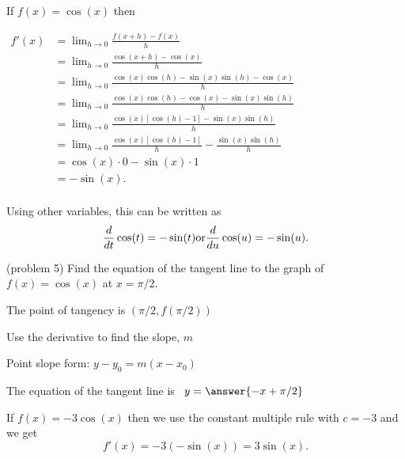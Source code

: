\documentclass{ximera}
\begin{document}
\begin{explanation}
If $f(x) = \cos(x)$ then\\
\begin{center}
$\begin{aligned}
f'(x) &= \lim_{h \to 0} \frac{f(x+h)-f(x)}{h} \\[5pt]
&= \lim_{h \to 0} \frac{\cos(x+h) - \cos(x)}{h}\\[5pt]
&=  \lim_{h \to 0} \frac{\cos(x)\cos(h) - \sin(x)\sin(h) - \cos(x)}{h}\\[5pt]
&=  \lim_{h \to 0} \frac{\cos(x)\cos(h) - \cos(x) - \sin(x)\sin(h)}{h}\\[5pt]
&=  \lim_{h \to 0} \frac{\cos(x)[\cos(h) -1] - \sin(x)\sin(h)}{h}\\[5pt]
&=  \lim_{h \to 0} \frac{\cos(x)[\cos(h) -1]}{h} - \frac{\sin(x)\sin(h)}{h}\\[5pt]
&=   \cos(x) \cdot 0 - \sin(x)\cdot 1\\[5pt]
&= -\sin(x).\\[5pt]
\end{aligned}$
\end{center}
Using other variables, this can be written as
\[
\frac{d}{dt} \cos(t) = -\sin(t) \\
\text{or}\\
\frac{d}{du} \cos(u) = -\sin(u).
\]

\end{explanation}


\begin{problem}(problem 5)
Find the equation of the tangent line to the graph of $f(x) = \cos(x)$ at $x=\pi/2.$


\begin{hint}
The point of tangency is $(\pi/2, f(\pi/2))$
\end{hint}
\begin{hint}
Use the derivative to find the slope, $m$
\end{hint}
\begin{hint}
Point slope form: $y-y_0 = m(x-x_0)$
\end{hint}

The equation of the tangent line is \ $y = \answer{-x + \pi/2}$

\end{problem}


\begin{example}[example 6]
 If $f(x) = -3\cos(x)$ then we use the constant multiple rule with $c = -3$ and we get 
\[
f'(x) = -3(-\sin(x)) = 3\sin(x).
\]
\end{example}
\end{document}

